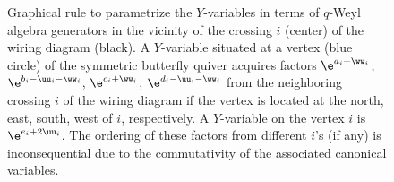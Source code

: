 \begin{figure}[t]\centering
{}
\caption{Graphical rule to parametrize the $Y$-variables in terms of
 $q$-Weyl algebra generators in the vicinity of the crossing $i$
 (center) of the wiring diagram (black). A $Y$-variable situated at
 a vertex (blue circle) of the symmetric butterfly quiver acquires
 factors $\e^{a_i+ \ww_i}$, $\e^{b_i-\uu_i-\ww_i}$, $\e^{c_i+\ww_i}$,
 $\e^{d_i-\uu_i-\ww_i}$ from the neighboring crossing $i$ of the wiring
 diagram if the vertex is located at the north, east, south, west of
 $i$, respectively. A $Y$-variable on the vertex $i$ is
 $\e^{e_i+2\uu_i}$. The ordering of these factors from different $i$'s
 (if any) is inconsequential due to the commutativity of the
 associated canonical variables. }\label{fig:para}
\end{figure}


